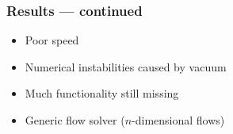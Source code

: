 \begin{frame}[<+(1)->]
\frametitle{Results --- continued}

\begin{itemize}
\item Poor speed
\item Numerical instabilities caused by vacuum
\item Much functionality still missing
\item Generic flow solver ($n$-dimensional flows)
\end{itemize}

\end{frame}
